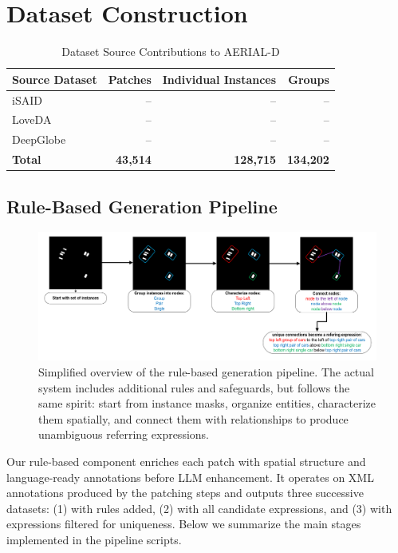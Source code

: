 \section{Dataset Construction}

\begin{table}[H]
\centering
\caption{Dataset Source Contributions to AERIAL-D}
\label{tab:dataset_sources}
\begin{tabular}{@{}lrrr@{}}
\toprule
\textbf{Source Dataset} & \textbf{Patches} & \textbf{Individual Instances} & \textbf{Groups} \\
\midrule
iSAID & -- & -- & -- \\
LoveDA & -- & -- & -- \\
DeepGlobe & -- & -- & -- \\
\midrule
\textbf{Total} & \textbf{43,514} & \textbf{128,715} & \textbf{134,202} \\
\bottomrule
\end{tabular}
\end{table}

\subsection{Rule-Based Generation Pipeline}

\begin{figure}[H]
\centering
\includegraphics[width=\textwidth]{rule_based_generation.png}
\caption{Simplified overview of the rule-based generation pipeline. The actual system includes additional rules and safeguards, but follows the same spirit: start from instance masks, organize entities, characterize them spatially, and connect them with relationships to produce unambiguous referring expressions.}
\label{fig:rule_based_generation}
\end{figure}

Our rule-based component enriches each patch with spatial structure and language-ready annotations before LLM enhancement. It operates on XML annotations produced by the patching steps and outputs three successive datasets: (1) with rules added, (2) with all candidate expressions, and (3) with expressions filtered for uniqueness. Below we summarize the main stages implemented in the pipeline scripts.

